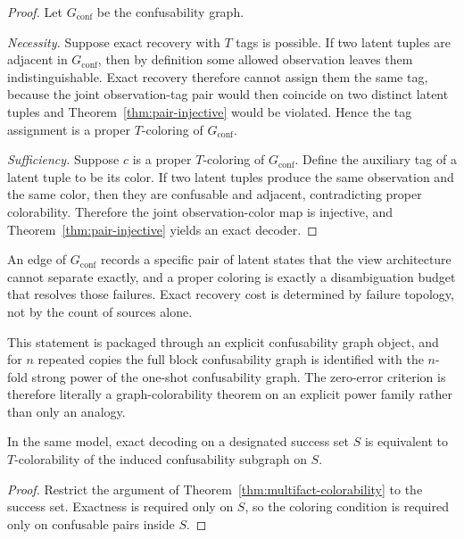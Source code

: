 \begin{proof}
Let $G_{\mathrm{conf}}$ be the confusability graph.

\emph{Necessity.} Suppose exact recovery with $T$ tags is possible. If two latent tuples are adjacent in $G_{\mathrm{conf}}$, then by definition some allowed observation leaves them indistinguishable. Exact recovery therefore cannot assign them the same tag, because the joint observation-tag pair would then coincide on two distinct latent tuples and Theorem~\ref{thm:pair-injective} would be violated. Hence the tag assignment is a proper $T$-coloring of $G_{\mathrm{conf}}$.

\emph{Sufficiency.} Suppose $c$ is a proper $T$-coloring of $G_{\mathrm{conf}}$. Define the auxiliary tag of a latent tuple to be its color. If two latent tuples produce the same observation and the same color, then they are confusable and adjacent, contradicting proper colorability. Therefore the joint observation-color map is injective, and Theorem~\ref{thm:pair-injective} yields an exact decoder.
\end{proof}

An edge of $G_{\mathrm{conf}}$ records a specific pair of latent states that the view architecture cannot separate exactly, and a proper coloring is exactly a disambiguation budget that resolves those failures. Exact recovery cost is determined by failure topology, not by the count of sources alone.

This statement is packaged through an explicit confusability graph object, and for $n$ repeated copies the full block confusability graph is identified with the $n$-fold strong power of the one-shot confusability graph. The zero-error criterion is therefore literally a graph-colorability theorem on an explicit power family rather than only an analogy.

\begin{theorem}\label{thm:multifact-success-set}
In the same model, exact decoding on a designated success set $S$ is equivalent to $T$-colorability of the induced confusability subgraph on $S$.
\end{theorem}

\begin{proof}
Restrict the argument of Theorem~\ref{thm:multifact-colorability} to the success set. Exactness is required only on $S$, so the coloring condition is required only on confusable pairs inside $S$.
\end{proof}

